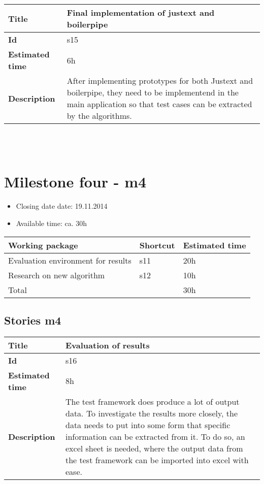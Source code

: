     \begin{tabular}{ | p{4cm} | p{10cm} |}
    \hline
    \textbf{Title} & Final implementation of justext and boilerpipe\\ \hline
    \textbf{Id} & s15\\ \hline
    \textbf{Estimated time} & 6h \\ \hline
    \textbf{Description} &  After implementing prototypes for both Justext and boilerpipe, they need to be implementend in the main application so that test cases can be extracted by the algorithms.\\ 
    \hline
    \end{tabular} \\\\





\section{Milestone four - m4}

\begin{itemize}
\item Closing date date: 19.11.2014
\item Available time: ca. 30h
\end{itemize}

    \begin{tabular}{ | p{10cm} | p{2cm} | p{2cm} |}
    \hline
    \textbf{Working package} & \textbf{Shortcut}& \textbf{Estimated time} \\ \hline
    Evaluation environment for results & s11 &20h \\
    Research on new algorithm & s12 &10h \\ \hline
    Total &  & 30h\\

    \hline
    \end{tabular}

\subsection {Stories m4}

    \begin{tabular}{ | p{4cm} | p{10cm} |}
    \hline
    \textbf{Title} & Evaluation of results\\ \hline
    \textbf{Id} & s16\\ \hline
    \textbf{Estimated time} & 8h \\ \hline
    \textbf{Description} &  The test framework does produce a lot of output data. To investigate the results more closely, the data needs to put into some form that specific information can be extracted from it. To do so, an excel sheet is needed, where the output data from the test framework can be imported into excel with ease.\\ 
    \hline
    \end{tabular} \\\\


